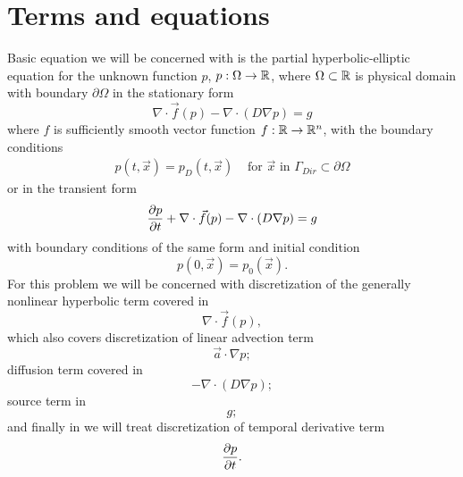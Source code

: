 \providecommand{\elint}{\int_{T^k}}
\providecommand{\elbint}{\int_{\partial T^k}}
\section{Terms and equations}
Basic equation we will be concerned with is the partial hyperbolic-elliptic 
equation for the unknown function $p$, $p : \Omega \rightarrow \mathbb{R}$, where 
$\Omega \subset \mathbb{R}$ is physical domain with boundary $\partial\Omega$ in 
the stationary form
\begin{equation}
\label{eq:hyp_diff}
\nabla\cdot \vec{f}(p) -  \nabla \cdot (D \nabla p) = g
\end{equation}
where $f$ is sufficiently smooth vector function $f: \mathbb{R} 
\rightarrow\mathbb{R}^n$, with the boundary conditions
\begin{align}\label{eq:diff_bcs}
p(t, \vec{x}) = p_D(t, \vec{x}) & \text{ for } \vec{x} \text{ in } 
                \Gamma_{Dir} \subset \partial\Omega 
\end{align}
or in the transient form
\begin{equation}
    \label{eq:hyp_diff_trans}
    \frac{\partial p}{\partial t} + \nabla\cdot \vec{f}(p) -  \nabla \cdot (D \nabla p) = g
\end{equation}
with boundary conditions of the same form and initial condition
\begin{equation}
    \label{eq:diff_ic}
    p(0, \vec{x}) = p_0(\vec{x}).
\end{equation}
For this problem we will be concerned with discretization of the generally 
nonlinear hyperbolic term covered in 
\begin{equation}
    \nabla\cdot \vec{f}(p),
\end{equation}
which also covers discretization of linear advection term
\begin{equation}
\vec{a} \cdot \nabla p;
\end{equation}
diffusion term covered in 
\begin{equation}
    -  \nabla \cdot (D \nabla p);
\end{equation}
source term in 
\begin{equation}
    g;
\end{equation}
and finally in  we will 
treat discretization of temporal derivative term
\begin{equation}
\frac{\partial p}{\partial t}.
\end{equation}



